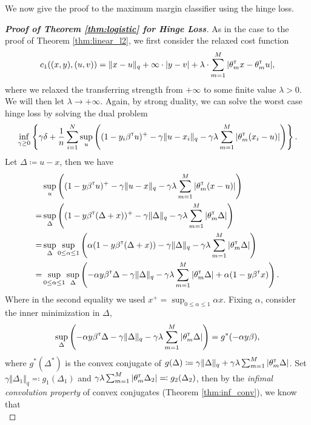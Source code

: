 \documentclass[12pt]{article}
\begin{document}
We now give the proof to the maximum margin classifier using the hinge loss.
\begin{proof}[\textbf{Proof of Theorem \ref{thm:logistic} for Hinge Loss}]
    As in the case to the proof of Theorem \ref{thm:linear_l2}, we first consider the relaxed cost function $$c_{1}((x,y),(u,v)) = \Vert x-u\Vert_q +\infty\cdot |y-v| + \lambda\cdot \sum_{m=1}^M |\theta_m^{\scriptscriptstyle \sf T} x - \theta_m^{\scriptscriptstyle \sf T} u|,$$ where we relaxed the transferring strength from $+\infty$ to some finite value $\lambda > 0$. We will then let $\lambda \to +\infty$. Again, by strong duality, we can solve the worst case hinge loss by solving the dual problem \[
    \inf_{\gamma\geq 0}\left\{ \gamma\delta+ \dfrac{1}{n}\sum_{i=1}^N \sup_u \left( (1-y_i\beta^{\scriptscriptstyle \sf T} u)^+ - \gamma \Vert u-x_i \Vert_q - \gamma \lambda \sum_{m=1}^M |\theta_m^{\scriptscriptstyle \sf T} (x_i-u)|\right)\right\}.
    \]Let $\Delta \coloneqq u-x$, then we have \begin{align*}
        &\sup_u \left( (1-y\beta^{\scriptscriptstyle \sf T} u)^+ - \gamma \Vert u-x \Vert_q - \gamma \lambda \sum_{m=1}^M |\theta_m^{\scriptscriptstyle \sf T} (x-u)|\right) \\
        =&\sup_\Delta \left( (1-y\beta^{\scriptscriptstyle \sf T} (\Delta+x))^+ - \gamma \Vert \Delta \Vert_q - \gamma \lambda \sum_{m=1}^M |\theta_m^{\scriptscriptstyle \sf T} \Delta|\right)\\
        =& \sup_{\Delta}\sup_{0\leq \alpha\leq 1}\left( \alpha(1-y\beta^{\scriptscriptstyle \sf T} (\Delta+x)) - \gamma \Vert \Delta \Vert_q - \gamma \lambda \sum_{m=1}^M |\theta_m^{\scriptscriptstyle \sf T} \Delta|\right)\\
        =&\sup_{0\leq \alpha\leq 1} \sup_{\Delta}\left( -\alpha y \beta^{\scriptscriptstyle \sf T}\Delta - \gamma\Vert\Delta\Vert_q - \gamma\lambda \sum_{m=1}^M|\theta_m^{\scriptscriptstyle \sf T} \Delta| +\alpha (1-y\beta^{\scriptscriptstyle \sf T} x)\right).
    \end{align*}
    Where in the second equality we used $x^+ = \sup_{0\leq \alpha\leq 1}\alpha x$. Fixing $\alpha$, consider the inner minimization in $\Delta$,
    \begin{align*}
        \sup_{\Delta}\left( -\alpha y \beta^{\scriptscriptstyle \sf T}\Delta - \gamma\Vert\Delta\Vert_q - \gamma\lambda \sum_{m=1}^M|\theta_m^{\scriptscriptstyle \sf T} \Delta|\right) 
        =g^*(-\alpha y \beta),
    \end{align*}
    where $g^*(\Delta^*)$ is the convex conjugate of $g(\Delta) \coloneqq \gamma\Vert\Delta\Vert_q + \gamma\lambda \sum_{m=1}^M|\theta_m^{\scriptscriptstyle \sf T} \Delta|$. Set $\gamma\Vert\Delta_1\Vert_q \eqqcolon g_1(\Delta_1)$ and $\gamma\lambda \sum_{m=1}^M|\theta_m^{\scriptscriptstyle \sf T} \Delta_2|\eqqcolon g_2(\Delta_2)$, then by the \textit{infimal convolution property} of convex conjugates (Theorem \ref{thm:inf_conv}), we know that \[
\]
\end{proof}
\end{document}
